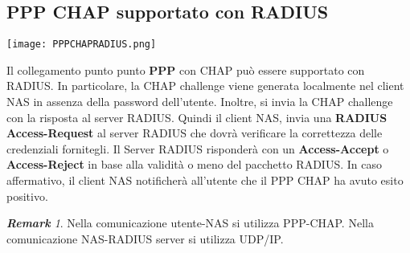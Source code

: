 \documentclass{article}
\theoremstyle{remark}
\newtheorem*{remark}{\textbf{Remark}}
\begin{document}
\subsection{PPP CHAP supportato con RADIUS}
\begin{center}
	\texttt{[image: PPPCHAPRADIUS.png]}
\end{center}
Il collegamento punto punto \textbf{PPP} con CHAP può essere supportato con RADIUS. In particolare, la CHAP challenge viene generata localmente nel client NAS in assenza della password dell'utente. Inoltre, si invia la CHAP challenge con la risposta al server RADIUS. Quindi il client NAS, invia una \textbf{RADIUS Access-Request} al server RADIUS che dovrà verificare la correttezza delle credenziali fornitegli. Il Server RADIUS risponderà con un \textbf{Access-Accept} o \textbf{Access-Reject} in base alla validità o meno del pacchetto RADIUS. In caso affermativo, il client NAS notificherà all'utente che il PPP CHAP ha avuto esito positivo.
\begin{remark}
	Nella comunicazione utente-NAS si utilizza PPP-CHAP.\newline
	Nella comunicazione NAS-RADIUS server si utilizza UDP/IP.
\end{remark}
\end{document}
